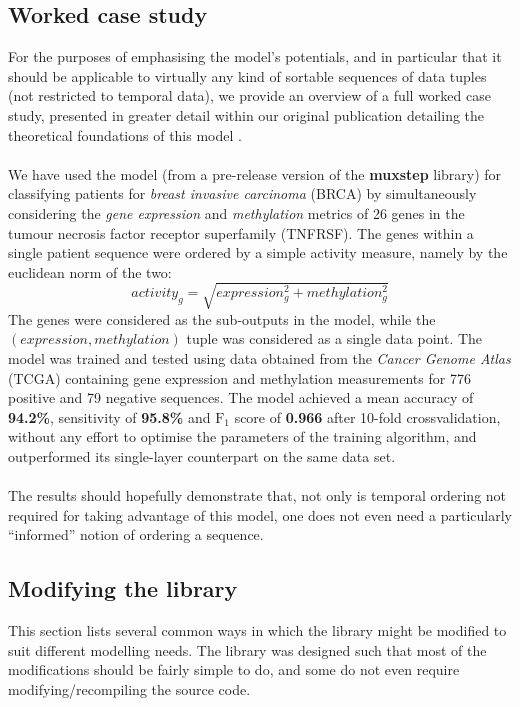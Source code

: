 \documentclass[12pt]{article}
\begin{document}
	\subsection{Worked case study}\label{sec:study}
	For the purposes of emphasising the model's potentials, and in particular that it should be applicable to virtually any kind of sortable sequences of data tuples (not restricted to temporal data), we provide an overview of a full worked case study, presented in greater detail within our original publication detailing the theoretical foundations of this model \cite{Velickovic15}.\\ \\
	We have used the model (from a pre-release version of the {\bf muxstep} library) for classifying patients for \emph{breast invasive carcinoma} (BRCA) by simultaneously considering the \emph{gene expression} and \emph{methylation} metrics of 26 genes in the tumour necrosis factor receptor superfamily (TNFRSF). The genes within a single patient sequence were ordered by a simple activity measure, namely by the euclidean norm of the two:
\begin{equation}
	activity_g = \sqrt{expression_g^2 + methylation_g^2}	
\end{equation}
The genes were considered as the sub-outputs in the model, while the $(expression, methylation)$ tuple was considered as a single data point. The model was trained and tested using data obtained from the \emph{Cancer Genome Atlas} (TCGA) containing gene expression and methylation measurements for 776 positive and 79 negative sequences. The model achieved a mean accuracy of {\bf 94.2\%}, sensitivity of {\bf 95.8\%} and $\text{F}_1$ score of {\bf 0.966} after 10-fold crossvalidation, without any effort to optimise the parameters of the training algorithm, and outperformed its single-layer counterpart on the same data set.\\ \\
The results should hopefully demonstrate that, not only is temporal ordering not required for taking advantage of this model, one does not even need a particularly ``informed'' notion of ordering a sequence.
	\subsection{Modifying the library}\label{sec:mod}
	This section lists several common ways in which the library might be modified to suit different modelling needs. The library was designed such that most of the modifications should be fairly simple to do, and some do not even require modifying/recompiling the source code.
\end{document}
